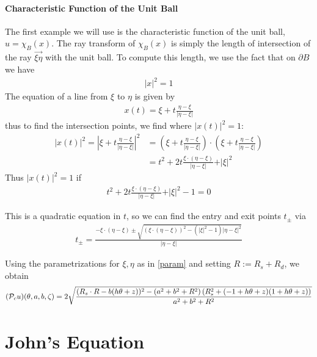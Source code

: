 \documentclass[12pt]{article}
\begin{document}
\paragraph{Characteristic Function of the Unit Ball}
The first example we will use is the characteristic function of the unit ball, $u = \chi_{B}(x)$.  The ray transform of $\chi_B(x)$ is simply the length of intersection of the ray $\overrightarrow{\xi\eta}$ with the unit ball.  To compute this length, we use the fact that on $\partial B$ we have
\begin{align*}
\vert x\vert ^2 = 1
\end{align*}  The equation of a line from $\xi$ to $\eta$ is given by 
\begin{align*}
x(t) = \xi+t\frac{\eta-\xi}{\vert \eta-\xi\vert}
\end{align*}thus to find the intersection points, we find where $\vert x(t)\vert^2 = 1$: 
\begin{align*}
\vert x(t)\vert ^2 = \left\vert \xi+t\frac{\eta-\xi}{\vert \eta-\xi\vert}\right\vert ^2  &= \left(\xi+t\frac{\eta-\xi}{\vert \eta-\xi\vert}\right)\cdot \left(\xi+t\frac{\eta-\xi}{\vert \eta-\xi\vert}\right)\\
& = t^2 + 2t\frac{\xi\cdot(\eta-\xi)}{\vert \eta -\xi\vert} + \vert \xi\vert^2
\end{align*}Thus $\vert x(t)\vert^2 = 1$ if 
\begin{align*}
t^2 + 2t\frac{\xi\cdot(\eta-\xi)}{\vert \eta -\xi\vert} + \vert \xi\vert^2-1=0
\end{align*}

This is a quadratic equation in $t$, so we can find the entry and exit points $t_{\pm}$ via 
\begin{align*}
t_{\pm} = \frac{-\xi\cdot(\eta-\xi)\pm\sqrt{(\xi\cdot (\eta-\xi))^2-(\vert\xi\vert^2-1)\vert\eta-\xi\vert^2}}{\vert\eta-\xi\vert}
\end{align*}

Using the parametrizations for $\xi,\eta$ as in \eqref{param} and setting $R:=R_s+R_d$, we obtain 
\begin{align*}
(\P_cu)(\theta,a,b,\zeta) = 2\sqrt{\frac{(R_s \cdot R-b (h \theta+z))^2-\left(a^2+b^2+R^2\right) \left(R_s^2+(-1+h \theta+z) (1+h \theta+z)\right)}{a^2+b^2+R^2}}
\end{align*}


\section{John's Equation}
\end{document}
